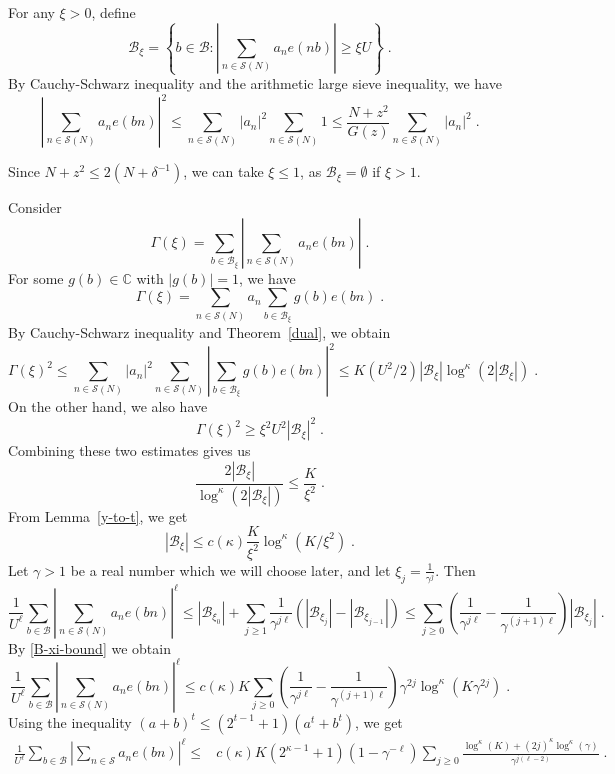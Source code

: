 \documentclass[12pt,article]{amsart}
\theoremstyle{remark}
\numberwithin{equation}{section}
\begin{document}
	
	
	For any $\xi>0$, define
	\[
	\mathcal{B}_{\xi}=\left\{b\in \mathcal{B}: |\sum_{n\in \mathcal{S}(N)}a_ne(nb)|\geq \xi U\right\}\;.
	\] By Cauchy-Schwarz inequality and the arithmetic large sieve inequality, we have 
	\[
	\left|\sum_{n\in \mathcal{S}(N)}a_ne(bn)\right|^2\leq \sum_{n\in \mathcal{S}(N)}|a_n|^2 \sum_{n\in \mathcal{S}(N)}1\leq \frac{N+z^2}{G(z)}\sum_{n\in \mathcal{S}(N)}|a_n|^2\; .
	\]
	
	
	\noindent 
	Since $N+z^2\leq 2(N+\delta^{-1})$, we can take $\xi\leq 1$, as $\mathcal{B}_{\xi}=\emptyset$ if $\xi>1.$
	
	\noindent
	Consider 
	\[
	\Gamma(\xi)=\sum_{b\in \mathcal{B}_{\xi}}\left|\sum_{n\in \mathcal{S}(N)}a_ne(bn)\right|\; .
	\]
	For some $g(b)\in \mathbb{C}$ with $|g(b)|=1$, we have 
	\[
	\Gamma(\xi)=\sum_{n\in \mathcal{S}(N)} a_n\sum_{b\in \mathcal{B}_{\xi}}g(b)e(bn)\; .
	\]
	By Cauchy-Schwarz inequality and Theorem~\ref{dual}, we obtain
	\[
	\Gamma(\xi)^2\leq \sum_{n\in \mathcal{S}(N)}|a_n|^2 \sum_{n\in \mathcal{S}(N)}\left|\sum_{b\in \mathcal{B}_\xi} g(b)e(bn)\right|^2\leq K (U^2/2) |\mathcal{B}_{\xi}|\log^\kappa(2|\mathcal{B}_{\xi}|)\; .
	\]
	On the other hand, we also have
	\[
	\Gamma(\xi)^2\geq \xi^2U^2 |\mathcal{B}_{\xi}|^2\; .
	\]
	Combining these two estimates gives us
	\[
	\frac{2|\mathcal{B}_{\xi}|}{\log^\kappa(2|\mathcal{B}_{\xi}|)}\leq \frac{K}{\xi^2}\; .
	\]
	From Lemma~\ref{y-to-t}, we get
	\begin{equation}
		\label{B-xi-bound}
		|\mathcal{B}_{\xi}|\leq c(\kappa) \frac{K}{\xi^2}\log^\kappa(K/\xi^2)\;.
	\end{equation}
	Let $\gamma>1$ be a real number which we will choose later, and let $\xi_j=\frac{1}{\gamma^j}$. Then
	\[
	\frac{1}{U^{\ell}}\sum_{b\in \mathcal{B}}\left|\sum_{n\in \mathcal{S}(N)}a_n e(bn)\right|^{\ell}\leq |\mathcal{B}_{\xi_0}|+\sum_{j\geq 1}\frac{1}{\gamma^{j\ell}}(|\mathcal{B}_{\xi_j}|-|\mathcal{B}_{\xi_{j-1}}|)\leq \sum_{j\geq 0}\left(\frac{1}{\gamma^{j\ell}}-\frac{1}{\gamma^{(j+1)\ell}}\right)|\mathcal{B}_{\xi_j}|\;.
	\]
	By \eqref{B-xi-bound} we obtain 
	\[
	\frac{1}{U^{\ell}}\sum_{b\in \mathcal{B}}\left|\sum_{n\in \mathcal{S}(N)}a_n e(bn)\right|^{\ell}\leq c(\kappa)K\sum_{j\geq 0}\left(\frac{1}{\gamma^{j\ell}}-\frac{1}{\gamma^{(j+1)\ell}}\right)\gamma^{2j}\log^{\kappa}(K\gamma^{2j})\; .
	\]
	Using the inequality $(a+b)^t\leq (2^{t-1}+1)(a^t+b^t)$, we get
	\begin{align*}
		\frac{1}{U^{\ell}}\sum_{b\in \mathcal{B}}\left|\sum_{n\in \mathcal{S}}a_n e(bn)\right|^{\ell}\leq &c(\kappa)K(2^{\kappa-1}+1)(1-\gamma^{-\ell})\sum_{j\geq 0}\frac{\log^{\kappa}(K)+(2j)^{\kappa}\log^{\kappa}(\gamma)}{\gamma^{j(\ell-2)}}\; .
	\end{align*}
	
\end{document}
